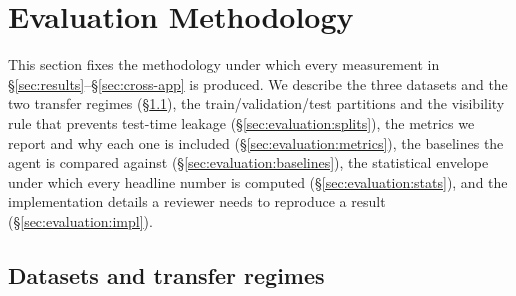 %
%

\section{Evaluation Methodology}
\label{sec:evaluation}

This section fixes the methodology under which every measurement in \S\ref{sec:results}--\S\ref{sec:cross-app} is produced. We describe the three datasets and the two transfer regimes (\S\ref{sec:evaluation:datasets}), the train/validation/test partitions and the visibility rule that prevents test-time leakage (\S\ref{sec:evaluation:splits}), the metrics we report and why each one is included (\S\ref{sec:evaluation:metrics}), the baselines the agent is compared against (\S\ref{sec:evaluation:baselines}), the statistical envelope under which every headline number is computed (\S\ref{sec:evaluation:stats}), and the implementation details a reviewer needs to reproduce a result (\S\ref{sec:evaluation:impl}).

\subsection{Datasets and transfer regimes}
\label{sec:evaluation:datasets}

